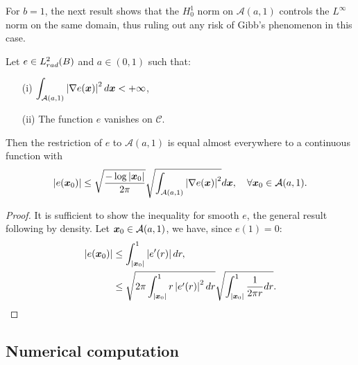 \documentclass[11pt,a4paper]{article}
\begin{document}
For $b = 1$, the next result shows that the $H_0^1$ norm on $\mathcal{A}(a,1)$ controls the $L^{\infty}$ norm on the same domain, thus ruling out any risk of Gibb's phenomenon in this case.
\begin{Lem}
	Let $e \in L^2_{rad}(B)$ and $a\in (0,1)$ such that:
	\begin{itemize}
		\item[(i)]$\displaystyle \int_{\mathcal{A}(a,1)} \left\lvert \nabla e(\boldsymbol{x}) \right\rvert^2 d\boldsymbol{x} < +\infty$,
		\item[(ii)] The function $e$ vanishes on $\mathcal{C}$.
	\end{itemize}
	Then the restriction of $e$ to $\mathcal{A}(a,1)$ is equal almost everywhere to a continuous function with
	\[\left\lvert e(\boldsymbol{x}_0) \right\rvert \leq \sqrt{\dfrac{-\log \left\lvert \boldsymbol{x}_0 \right\rvert}{2\pi}}\sqrt{\int_{\mathcal{A}(a,1)} \left\lvert \nabla e(\boldsymbol{x}) \right\rvert^2} d\boldsymbol{x},\quad  \forall \boldsymbol{x}_0 \in \mathcal{A}(a,1).\]
	\begin{proof}
		It is sufficient to show the inequality for smooth $e$, the general result following by density. Let $\boldsymbol{x}_0 \in \mathcal{A}(a,1)$, we have, since $e(1)=0$:
		\begin{align*}
			\left\lvert e(\boldsymbol{x}_0) \right\rvert & \leq \int_{\left\lvert \boldsymbol{x}_0 \right\rvert}^1 \left\lvert e'(r) \right\rvert dr,                                                                             \\
			                  & \leq \sqrt{2\pi \int_{\left\lvert \boldsymbol{x}_0 \right\rvert}^1 r \left\lvert e'(r) \right\rvert^2 dr} \sqrt{\int_{\left\lvert \boldsymbol{x}_0 \right\rvert}^1 \frac{1}{2\pi r} dr}.\qedhere 
		\end{align*}					
	\end{proof}
\end{Lem}

\subsection{Numerical computation}
\label{sub:Chol}
\end{document}
